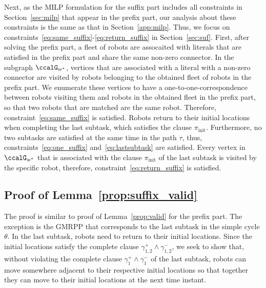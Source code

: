 \documentclass[Afour,sageh,times]{sagej}
\begin{document}
{{Next, as the MILP formulation for the suffix part includes all constraints in Section~\ref{sec:milp} that appear in the prefix part, our analysis about these constraints is the same as that in Section~\ref{app:milp}. Thus, we focus on constraints~\eqref{eq:same_suffix}-\eqref{eq:return_suffix} in Section~\ref{sec:suf}. First, after solving  the prefix part, a fleet of robots are assocaited with literals that are  satisfied in the prefix part and share the same non-zero connector. In the subgraph $\ccalG_{w^*}$,  vertices  that are associated with a literal with a non-zero connector are visited by  robots belonging to the obtained fleet of robots in the prefix part. We enumerate these vertices to  have a one-to-one-correspondence between robots visiting them and robots in the obtained fleet in the prefix part, so that  two  robots that are matched  are the same robot. Therefore, constraint~\eqref{eq:same_suffix} is satisfied. Robots return to their initial locations when completing the last subtask, which satisfies the clause $\pi_{\text{init}}$. Furthermore, no two subtasks are satisfied at the same time in the path $\tau$, thus, constraints~\eqref{eq:one_suffix} and~\eqref{eq:lastsubtask} are  satisfied. Every vertex in $\ccalG_{w^*}$ that is associated with the clause $\pi_{\text{init}}$ of the last subtask is visited by the specific  robot, therefore, constraint~\eqref{eq:return_suffix} is satisfied.
\subsection{Proof of Lemma~\ref{prop:suffix_valid}}\label{app:suffix_valid}
The proof is similar to proof of Lemma~\ref{prop:valid} for the prefix part. The exception is the GMRPP that corresponds to the last subtask in the simple cycle $\theta$. In the last subtask, robots need to return to their initial locations. Since the initial locations satisfy the complete clause $\gamma_{1,2}^+ \wedge \gamma_{1,2}^-$,  we seek to show that, without violating the complete clause $\gamma_1^+ \wedge \gamma_1^-$ of the last subtask,  robots can move somewhere  adjacent to their respective initial locations so that  together they can move to their initial locations at the next time instant.

}}
\end{document}
